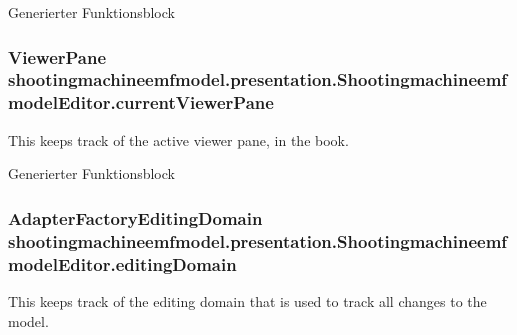 Generierter Funktionsblock \hypertarget{classshootingmachineemfmodel_1_1presentation_1_1_shootingmachineemfmodel_editor_a89ab81f45d570dff37c5ca43a3b2b208}{
\subsubsection[{current\-Viewer\-Pane}]{\setlength{\rightskip}{0pt plus 5cm}Viewer\-Pane shootingmachineemfmodel.\-presentation.\-Shootingmachineemfmodel\-Editor.\-current\-Viewer\-Pane\hspace{0.3cm}{\ttfamily [protected]}}}\label{classshootingmachineemfmodel_1_1presentation_1_1_shootingmachineemfmodel_editor_a89ab81f45d570dff37c5ca43a3b2b208}
This keeps track of the active viewer pane, in the book.

Generierter Funktionsblock \hypertarget{classshootingmachineemfmodel_1_1presentation_1_1_shootingmachineemfmodel_editor_a2e9e461c070672d140cec34e7b28a33f}{
\subsubsection[{editing\-Domain}]{\setlength{\rightskip}{0pt plus 5cm}Adapter\-Factory\-Editing\-Domain shootingmachineemfmodel.\-presentation.\-Shootingmachineemfmodel\-Editor.\-editing\-Domain\hspace{0.3cm}{\ttfamily [protected]}}}\label{classshootingmachineemfmodel_1_1presentation_1_1_shootingmachineemfmodel_editor_a2e9e461c070672d140cec34e7b28a33f}
This keeps track of the editing domain that is used to track all changes to the model.

